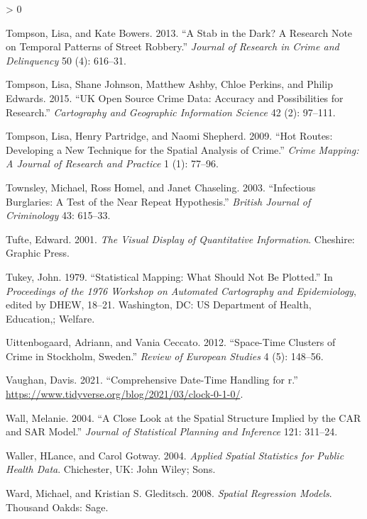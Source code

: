 \documentclass[
  krantz2]{krantz}
\newlength{\cslhangindent}
\newenvironment{CSLReferences}[2] %
 {%
  \setlength{\parindent}{0pt}
  \ifodd #1 \everypar{\setlength{\hangindent}{\cslhangindent}}\ignorespaces\fi
  \ifnum #2 > 0
  \setlength{\parskip}{#2\baselineskip}
  \fi
 }%
 {}
\begin{document}
\begin{CSLReferences}{1}{0}
\leavevmode\hypertarget{ref-Tompson_2013}{}%
Tompson, Lisa, and Kate Bowers. 2013. {``A Stab in the Dark? A Research Note on Temporal Patterns of Street Robbery.''} \emph{Journal of Research in Crime and Delinquency} 50 (4): 616--31.

\leavevmode\hypertarget{ref-Tompson_2015}{}%
Tompson, Lisa, Shane Johnson, Matthew Ashby, Chloe Perkins, and Philip Edwards. 2015. {``UK Open Source Crime Data: Accuracy and Possibilities for Research.''} \emph{Cartography and Geographic Information Science} 42 (2): 97--111.

\leavevmode\hypertarget{ref-Tompson_2009}{}%
Tompson, Lisa, Henry Partridge, and Naomi Shepherd. 2009. {``Hot Routes: Developing a New Technique for the Spatial Analysis of Crime.''} \emph{Crime Mapping: A Journal of Research and Practice} 1 (1): 77--96.

\leavevmode\hypertarget{ref-Townsley_2003}{}%
Townsley, Michael, Ross Homel, and Janet Chaseling. 2003. {``Infectious Burglaries: A Test of the Near Repeat Hypothesis.''} \emph{British Journal of Criminology} 43: 615--33.

\leavevmode\hypertarget{ref-Tufte_2001}{}%
Tufte, Edward. 2001. \emph{The Visual Display of Quantitative Information}. Cheshire: Graphic Press.

\leavevmode\hypertarget{ref-Tukey_1979}{}%
Tukey, John. 1979. {``Statistical Mapping: What Should Not Be Plotted.''} In \emph{Proceedings of the 1976 Workshop on Automated Cartography and Epidemiology}, edited by DHEW, 18--21. Washington, DC: US Department of Health, Education,; Welfare.

\leavevmode\hypertarget{ref-Uittenbogaard_2012}{}%
Uittenbogaard, Adriann, and Vania Ceccato. 2012. {``Space-Time Clusters of Crime in Stockholm, Sweden.''} \emph{Review of European Studies} 4 (5): 148--56.

\leavevmode\hypertarget{ref-Vaughan_2021}{}%
Vaughan, Davis. 2021. {``Comprehensive Date-Time Handling for r.''} \url{https://www.tidyverse.org/blog/2021/03/clock-0-1-0/}.

\leavevmode\hypertarget{ref-Wall_2004}{}%
Wall, Melanie. 2004. {``A Close Look at the Spatial Structure Implied by the CAR and SAR Model.''} \emph{Journal of Statistical Planning and Inference} 121: 311--24.

\leavevmode\hypertarget{ref-Waller_2004}{}%
Waller, HLance, and Carol Gotway. 2004. \emph{Applied Spatial Statistics for Public Health Data}. Chichester, UK: John Wiley; Sons.

\leavevmode\hypertarget{ref-Ward_2008}{}%
Ward, Michael, and Kristian S. Gleditsch. 2008. \emph{Spatial Regression Models}. Thousand Oakds: Sage.


\end{CSLReferences}
\end{document}
